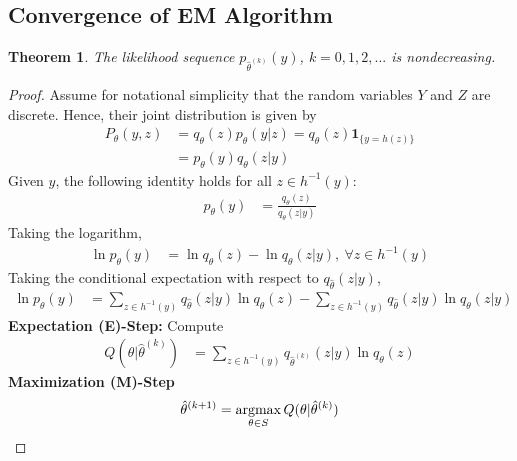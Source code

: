 \documentclass[11pt,a4paper]{article}
\newcommand{\argmax}{\operatornamewithlimits{argmax}}
\newtheorem{theorem}{Theorem}
\begin{document}
\subsection{Convergence of EM Algorithm}
\begin{theorem}
    The likelihood sequence $p_{\hat{\theta}^{(k)}}(y)$, $k = 0, 1, 2, ...$ is nondecreasing.
\end{theorem}
\begin{proof}
    Assume for notational simplicity that the random variables $Y$ and $Z$ are discrete. Hence, their joint distribution is given by
    \begin{equation}
        \begin{aligned}
            P_\theta(y,z)&=q_\theta(z)p_\theta(y|z)=q_\theta(z)\mathbf{1}_{\{y=h(z)\}}\\
            &=p_\theta(y)q_\theta(z|y)
        \end{aligned}
        \nonumber
    \end{equation}
    Given $y$, the following identity holds for all $z \in h^{-1}(y)$:
    \begin{equation}
        \begin{aligned}
            p_\theta(y)&=\frac{q_\theta(z)}{q_\theta(z|y)}
        \end{aligned}
        \nonumber
    \end{equation}
    Taking the logarithm,
    \begin{equation}
        \begin{aligned}
            \ln p_\theta(y)&= \ln q_\theta(z)-\ln q_\theta(z|y),\ \forall z\in h^{-1}(y)
        \end{aligned}
        \nonumber
    \end{equation}
    Taking the conditional expectation with respect to $q_{\hat{\theta}}(z|y)$,
    \begin{equation}
        \begin{aligned}
            \ln p_\theta(y)&= \sum_{z\in h^{-1}(y)}q_{\hat{\theta}}(z|y)\ln q_\theta(z)-\sum_{z\in h^{-1}(y)}q_{\hat{\theta}}(z|y)\ln q_\theta(z|y)
        \end{aligned}
        \tag{1}
    \end{equation}
    \textbf{Expectation (E)-Step:}
        Compute
        \begin{equation}
            \begin{aligned}
                Q(\theta|\hat{\theta}^{(k)})
                &=\sum_{z\in h^{-1}(y)}q_{\hat{\theta}^{(k)}}(z|y)\ln q_\theta(z)
            \end{aligned}
            \nonumber
        \end{equation}
    \textbf{Maximization (M)-Step} $$\hat{\theta}^{(k+1)}=\argmax_{\theta\in S}Q(\theta|\hat{\theta}^{(k)})$$


\end{proof}
\end{document}
